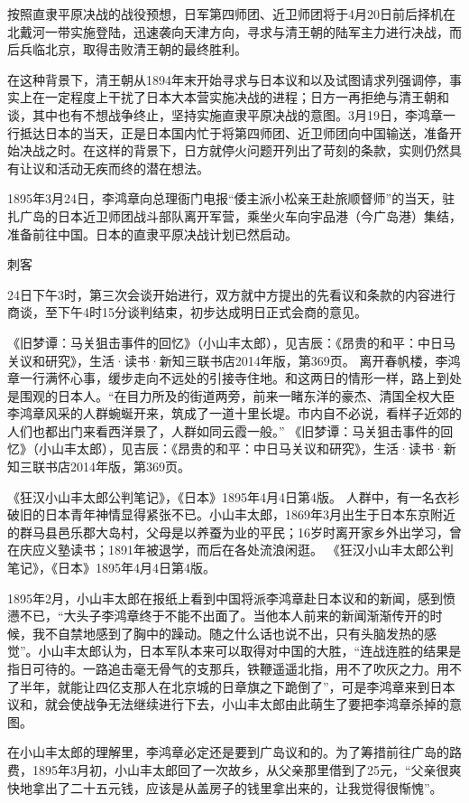 \documentclass[12pt,UTF8]{ctexbook}
\begin{document}
按照直隶平原决战的战役预想，日军第四师团、近卫师团将于4月20日前后择机在北戴河一带实施登陆，迅速袭向天津方向，寻求与清王朝的陆军主力进行决战，而后兵临北京，取得击败清王朝的最终胜利。

在这种背景下，清王朝从1894年末开始寻求与日本议和以及试图请求列强调停，事实上在一定程度上干扰了日本大本营实施决战的进程；日方一再拒绝与清王朝和谈，其中也有不想战争终止，坚持实施直隶平原决战的意图。3月19日，李鸿章一行抵达日本的当天，正是日本国内忙于将第四师团、近卫师团向中国输送，准备开始决战之时。在这样的背景下，日方就停火问题开列出了苛刻的条款，实则仍然具有让议和活动无疾而终的潜在想法。

1895年3月24日，李鸿章向总理衙门电报“倭主派小松亲王赴旅顺督师”的当天，驻扎广岛的日本近卫师团战斗部队离开军营，乘坐火车向宇品港（今广岛港）集结，准备前往中国。日本的直隶平原决战计划已然启动。

刺客

24日下午3时，第三次会谈开始进行，双方就中方提出的先看议和条款的内容进行商谈，至下午4时15分谈判结束，初步达成明日正式会商的意见。

《旧梦谭：马关狙击事件的回忆》（小山丰太郎），见吉辰：《昂贵的和平：中日马关议和研究》，生活·读书·新知三联书店2014年版，第369页。
离开春帆楼，李鸿章一行满怀心事，缓步走向不远处的引接寺住地。和这两日的情形一样，路上到处是围观的日本人。“在目力所及的街道两旁，前来一睹东洋的豪杰、清国全权大臣李鸿章风采的人群蜿蜒开来，筑成了一道十里长堤。市内自不必说，看样子近郊的人们也都出门来看西洋景了，人群如同云霞一般。” 《旧梦谭：马关狙击事件的回忆》（小山丰太郎），见吉辰：《昂贵的和平：中日马关议和研究》，生活·读书·新知三联书店2014年版，第369页。

《狂汉小山丰太郎公判笔记》，《日本》1895年4月4日第4版。
人群中，有一名衣衫破旧的日本青年神情显得紧张不已。小山丰太郎，1869年3月出生于日本东京附近的群马县邑乐郡大岛村，父母是以养蚕为业的平民；16岁时离开家乡外出学习，曾在庆应义塾读书；1891年被退学，而后在各处流浪闲逛。 《狂汉小山丰太郎公判笔记》，《日本》1895年4月4日第4版。

1895年2月，小山丰太郎在报纸上看到中国将派李鸿章赴日本议和的新闻，感到愤懑不已，“大头子李鸿章终于不能不出面了。当他本人前来的新闻渐渐传开的时候，我不自禁地感到了胸中的躁动。随之什么话也说不出，只有头脑发热的感觉”。小山丰太郎认为，日本军队本来可以取得对中国的大胜，“连战连胜的结果是指日可待的。一路追击毫无骨气的支那兵，铁鞭遥遥北指，用不了吹灰之力。用不了半年，就能让四亿支那人在北京城的日章旗之下跪倒了”，可是李鸿章来到日本议和，就会使战争无法继续进行下去，小山丰太郎由此萌生了要把李鸿章杀掉的意图。

在小山丰太郎的理解里，李鸿章必定还是要到广岛议和的。为了筹措前往广岛的路费，1895年3月初，小山丰太郎回了一次故乡，从父亲那里借到了25元，“父亲很爽快地拿出了二十五元钱，应该是从盖房子的钱里拿出来的，让我觉得很惭愧”。
\end{document}
